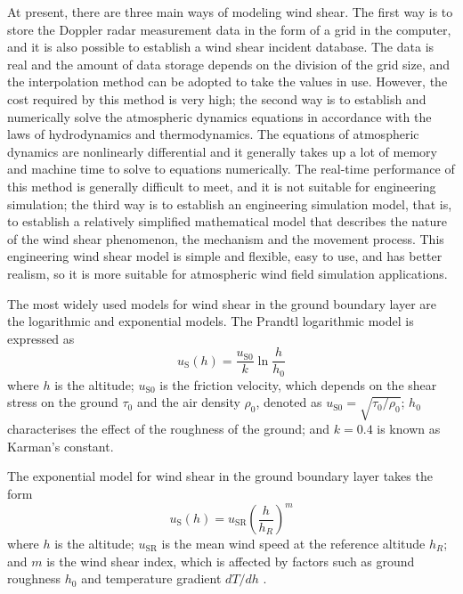 At present, there are three main ways of modeling wind shear. The first way is to store the Doppler radar measurement data in the form of a grid in the computer, and it is also possible to establish a wind shear incident database. The data is real and the amount of data storage depends on the division of the grid size, and the interpolation method can be adopted to take the values in use. However, the cost required by this method is very high; the second way is to establish and numerically solve the atmospheric dynamics equations in accordance with the laws of hydrodynamics and thermodynamics. The equations of atmospheric dynamics are nonlinearly differential and it generally takes up a lot of memory and machine time to solve to equations numerically. The real-time performance of this method is generally difficult to meet, and it is not suitable for engineering simulation; the third way is to establish an engineering simulation model, that is, to establish a relatively simplified mathematical model that describes the nature of the wind shear phenomenon, the mechanism and the movement process. This engineering wind shear model is simple and flexible, easy to use, and has better realism, so it is more suitable for atmospheric wind field simulation applications\cite{noauthor__nodate}.

The most widely used models for wind shear in the ground boundary layer are the logarithmic and exponential models. The Prandtl logarithmic model is expressed as
\begin{equation}\label{eq8}
u_{\mathrm{S}}(h)=\frac{u_{\mathrm{S} 0}}{k} \ln \frac{h}{h_0}
\end{equation}
where $h$ is the altitude; $u_{\mathrm{S0}}$ is the friction velocity, which depends on the shear stress on the ground $\tau_0$ and the air density $\rho_0$, denoted as $u_{\mathrm{S0}}=\sqrt{\tau_0/\rho_0}$; $h_0$ characterises the effect of the roughness of the ground; and $k=0.4$ is known as Karman's constant.

The exponential model for wind shear in the ground boundary layer takes the form
\begin{equation}\label{eq9}
u_{\mathrm{S}}(h)=u_{\mathrm{SR}}\left(\frac{h}{h_R}\right)^m
\end{equation}
where $h$ is the altitude; $u_{\mathrm{SR}}$ is the mean wind speed at the reference altitude $h_R$; and $m$ is the wind shear index, which is affected by factors such as ground roughness $h_0$ and temperature gradient ${dT/dh}$ \cite{gipe1993wind}.


